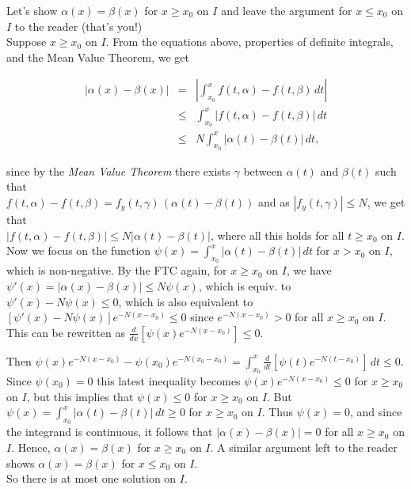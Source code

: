 \documentclass{ximera}
\begin{document}
Let's show $\alpha(x)=\beta (x)$ for $x\geq x_0$ on $I$ and leave the argument for $x\leq x_0$ on $I$ to the reader (that's you!)\\

Suppose $x\geq x_0$ on $I$.  From the equations above, properties of definite integrals, and the Mean Value Theorem, we get

\begin{eqnarray*}
  |\alpha(x)-\beta(x)| &=& \left|\int_{x_0}^x f(t,\alpha)-f(t,\beta)\,dt \right| \\
   &\leq & \int_{x_0}^x |f(t,\alpha)-f(t,\beta)|\,dt \\
   &\leq & N\int_{x_0}^x |\alpha(t)-\beta(t)|\,dt,
\end{eqnarray*}


since by the \emph{Mean Value Theorem} there exists $\gamma$ between $\alpha(t)$ and $\beta(t)$ such that\\ $f(t,\alpha)-f(t,\beta)=f_y (t,\gamma)\, (\alpha(t)-\beta(t))$ and as $|f_y (t,\gamma)|\leq N$, we get that \\$|f(t,\alpha)-f(t,\beta)|\leq N|\alpha(t)-\beta(t)|$, where all this holds for all $t\geq x_0$ on $I$.  \\

Now we focus on the function $\displaystyle \psi(x) =\int_{x_0}^x |\alpha(t)-\beta(t)|\,dt$ for $x>x_0$ on $I$, which is non-negative.  By the FTC again, for $x\geq x_0$ on $I$, we have $\psi'(x)=|\alpha(x)-\beta(x)|\leq N\psi(x)$, which is equiv. to $\psi'(x)-N\psi(x)\leq 0$, which is also equivalent to $[\psi'(x)-N\psi(x)]e^{-N(x-x_0)}\leq 0$ since $e^{-N(x-x_0)}>0$ for all $x\geq x_0$ on $I$. This can be rewritten as $\displaystyle \frac{d}{dx}\left[\psi(x)e^{-N(x-x_0)}\right]\leq 0$.

Then $\displaystyle \psi(x)e^{-N(x-x_0)}-\psi(x_0)e^{-N(x_0-x_0)}=\int_{x_0}^x \frac{d}{dt}\left[\psi(t)e^{-N(t-x_0)}\right]\,dt \leq 0$.  Since
$\psi(x_0)=0$ this latest inequality becomes $\psi(x)e^{-N(x-x_0)}\leq 0$ for $x\geq x_0$ on $I$, but this implies that $\psi(x)\leq 0$  for $x\geq x_0$ on $I$.  But $\displaystyle \psi(x)=\int_{x_0}^x |\alpha(t)-\beta(t)|\,dt\geq 0$ for $x\geq x_0$ on $I$.  Thus $\psi(x)=0$, and since the integrand is continuous, it follows that $|\alpha(x)-\beta(x)|=0$ for all $x\geq x_0$ on $I$.  Hence, $\alpha(x)=\beta(x)$ for $x\geq x_0$ on $I$.  A similar argument left to the reader shows $\alpha(x)=\beta(x)$ for $x\leq x_0$ on $I$.\\

So there is at most one solution on $I$. 
\end{document}
